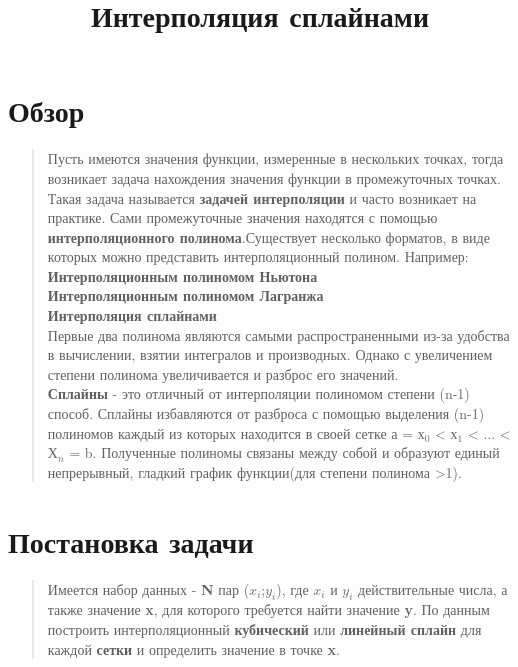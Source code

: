 \documentclass{article}
\title{Интерполяция сплайнами}
\begin{document}
\maketitle

\section{Обзор}
\begin{quotation}
Пусть имеются значения функции, измеренные в нескольких точках, тогда возникает задача нахождения значения функции в промежуточных точках.\\

	Такая задача называется \textbf{задачей интерполяции} и часто возникает на практике. Сами промежуточные значения находятся с помощью \textbf{интерполяционного полинома}.Существует несколько форматов, в виде которых можно представить интерполяционный полином. Например:\\  
	\textbf{Интерполяционным полиномом Ньютона}\\
	\textbf{Интерполяционным полиномом Лагранжа}\\
	\textbf{Интерполяция сплайнами}\\
	
	Первые два полинома являются самыми распространенными из-за удобства в вычислении, взятии интегралов и производных. Однако с увеличением степени полинома увеличивается и разброс его значений.\\
	\textbf{Сплайны} - это отличный от интерполяции полиномом степени (n-1) способ. Сплайны избавляются от разброса с помощью выделения (n-1) полиномов каждый из которых находится в своей сетке а = $х_0$ < $х_1$ < ... < $Х_n$ = b. Полученные полиномы связаны между собой и образуют единый непрерывный, гладкий  график функции(для степени полинома >1).
	\end{quotation}
\section{Постановка задачи}
\begin{quotation}

	Имеется набор данных - \textbf{N} пар (\textbf{$x_i$};\textbf{$y_i$}), где \textbf{$x_i$} и \textbf{$y_i$} действительные числа, а также значение \textbf{x}, для которого требуется найти значение \textbf{y}. По данным построить интерполяционный \textbf{кубический} или \textbf{линейный сплайн} для каждой \textbf{сетки} и определить значение в точке \textbf{x}.
	\newpage
\end{quotation}
\end{document}
